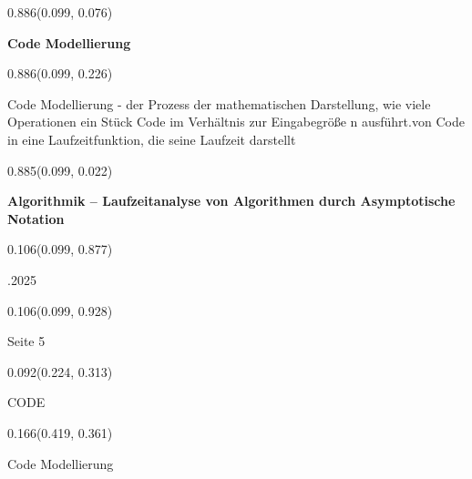 \documentclass[aspectratio=169]{beamer}
\begin{document}
\begin{frame}[fragile]
\begin{textblock}{0.886}(0.099, 0.076)
  \begin{minipage}[t][0.131\paperheight]{\linewidth}
    \textbf{Code Modellierung}
  \end{minipage}
\end{textblock}
\begin{textblock}{0.886}(0.099, 0.226)
  \begin{minipage}[b][0.63\paperheight]{\linewidth}
    \small
    Code Modellierung - der Prozess der mathematischen Darstellung, wie viele Operationen ein Stück Code im Verhältnis zur Eingabegröße n ausführt.\nUmwandlung von Code in eine Laufzeitfunktion, die seine Laufzeit darstellt
  \end{minipage}
\end{textblock}
\begin{textblock}{0.885}(0.099, 0.022)
  \begin{minipage}[b][0.031\paperheight]{\linewidth}
    \raggedright
    \fontsize{3}{3.3}\selectfont
    \textbf{Algorithmik – Laufzeitanalyse von Algorithmen durch Asymptotische Notation}
  \end{minipage}
\end{textblock}
\begin{textblock}{0.106}(0.099, 0.877)
  \begin{minipage}[b][0.026\paperheight]{\linewidth}
    \raggedright
    \fontsize{3}{3.3}.2025
  \end{minipage}
\end{textblock}
\begin{textblock}{0.106}(0.099, 0.928)
  \begin{minipage}[b][0.031\paperheight]{\linewidth}
    \raggedright
    \fontsize{3}{3.3}\selectfont
    Seite 5
  \end{minipage}
\end{textblock}
\begin{textblock}{0.092}(0.224, 0.313)
  \begin{minipage}[t][0.161\paperheight]{\linewidth}
    \tiny
    CODE
  \end{minipage}
\end{textblock}
\begin{textblock}{0.166}(0.419, 0.361)
  \begin{minipage}[t][0.054\paperheight]{\linewidth}
    \tiny
    Code Modellierung
  \end{minipage}

\end{textblock}
\end{frame}
\end{document}

